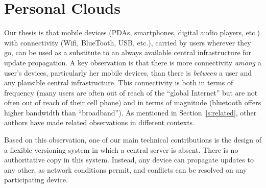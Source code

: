 


\section{Personal Clouds}
\label{sec:model}

Our thesis is that mobile devices (PDAs, smartphones, digital audio
players, etc.) with connectivity (Wifi, BlueTooth, USB, etc.), carried
by users wherever they go, can be used as a substitute to an always
available central infrastructure for update propagation. A key
observation is that there is more connectivity \emph{among} a user's
devices, particularly her mobile devices, than there is \emph{between} a
user and any plausible central infrastructure. This connectivity is both
in terms of frequency (many users are often out of reach of the ``global
Internet'' but are not often out of reach of their cell phone) and in
terms of magnitude (bluetooth offers higher bandwidth than
``broadband'').  As mentioned in
Section~\ref{s:related}, other authors have made related observations
in different contexts.  

Based on this observation, one of our main technical contributions is the design of a
flexible versioning system in which a central server is absent.
There is no authoritative copy in this system. 
Instead, any device can propagate updates to any other, as network
conditions permit, and conflicts can be resolved on any participating 
device. 

